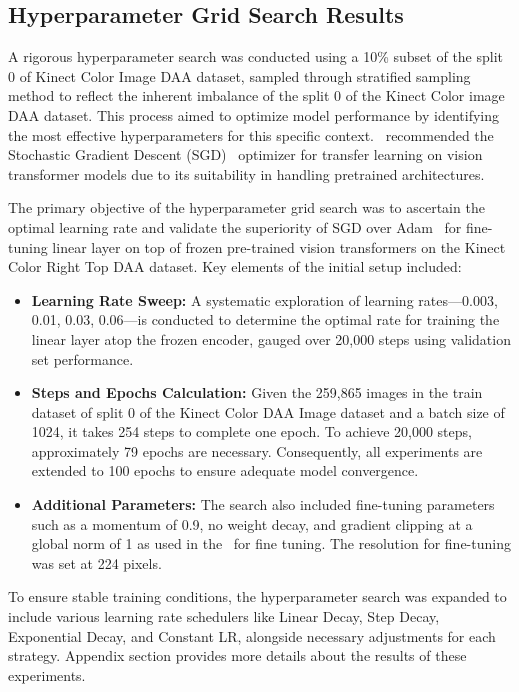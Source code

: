 \subsection{Hyperparameter Grid Search Results}
A rigorous hyperparameter search was conducted using a 10\% subset of the split 0 of Kinect Color Image DAA dataset, sampled through stratified sampling method to reflect the inherent imbalance of the split 0 of the Kinect Color image DAA dataset. This process aimed to optimize model performance by identifying the most effective hyperparameters for this specific context.~\citet{Vit_Paper_Dosovitskiy2020AnII} recommended the Stochastic Gradient Descent (SGD)~\citep{pytorch_sgd} optimizer for transfer learning on vision transformer models due to its suitability in handling pretrained architectures.

The primary objective of the hyperparameter grid search was to ascertain the optimal learning rate and validate the superiority of SGD over Adam~\citep{Adam_Kingma2014AdamAM} for fine-tuning linear layer on top of frozen pre-trained vision transformers on the Kinect Color Right Top DAA dataset. Key elements of the initial setup included:
\begin{itemize}
    \item \textbf{Learning Rate Sweep:} A systematic exploration of learning rates—0.003, 0.01, 0.03, 0.06—is conducted to determine the optimal rate for training the linear layer atop the frozen encoder, gauged over 20,000 steps using validation set performance.
    \item \textbf{Steps and Epochs Calculation:} Given the 259,865 images in the train dataset of split 0 of the Kinect Color DAA Image dataset and a batch size of 1024, it takes 254 steps to complete one epoch. To achieve 20,000 steps, approximately 79 epochs are necessary. Consequently, all experiments are extended to 100 epochs to ensure adequate model convergence.
    \item \textbf{Additional Parameters:} The search also included fine-tuning parameters such as a momentum of 0.9, no weight decay, and gradient clipping at a global norm of 1 as used in the~\citep{Vit_Paper_Dosovitskiy2020AnII} for fine tuning. The resolution for fine-tuning was set at 224 pixels.
\end{itemize}

To ensure stable training conditions, the hyperparameter search was expanded to include various learning rate schedulers like Linear Decay, Step Decay, Exponential Decay, and Constant LR, alongside necessary adjustments for each strategy. Appendix section provides more details about the results of these experiments.

